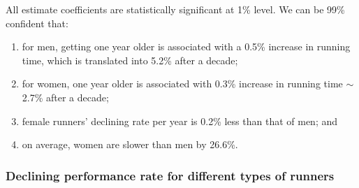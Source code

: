 \documentclass[12pt]{article}
\begin{document}
All estimate coefficients are statistically significant at 1\% level.
We can be 99\% confident that:
\begin{enumerate}[label=(\roman*)]
	\item for men, getting one year older is associated with a 0.5\%
		increase in running time, which is translated into 5.2\% after a decade;
	\item for women, one year older is associated with 0.3\% increase in
		running time $\sim$ 2.7\% after a decade;
	\item female runners' declining rate per year is 0.2\% less than that of
		men; and
	\item on average, women are slower than men by 26.6\%.
\end{enumerate}

\subsubsection*{Declining performance rate for different types of runners}
\end{document}
